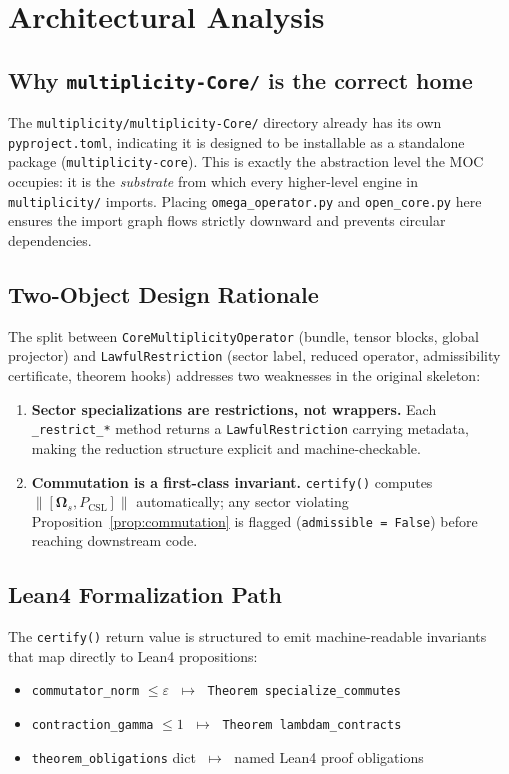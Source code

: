 \documentclass[12pt,a4paper]{article}
\theoremstyle{plain}
\theoremstyle{definition}
\theoremstyle{remark}
\newcommand{\norm}[1]{\left\lVert #1 \right\rVert}
\newcommand{\eps}{\varepsilon}
\begin{document}
\section{Architectural Analysis}
\label{sec:arch}

\subsection{Why \texttt{multiplicity-Core/} is the correct home}

The \texttt{multiplicity/multiplicity-Core/} directory already has its
own \texttt{pyproject.toml}, indicating it is designed to be installable
as a standalone package (\texttt{multiplicity-core}). This is exactly the
abstraction level the MOC occupies: it is the \emph{substrate} from which
every higher-level engine in \texttt{multiplicity/} imports.
Placing \texttt{omega\_operator.py} and \texttt{open\_core.py} here ensures
the import graph flows strictly downward and prevents circular dependencies.

\subsection{Two-Object Design Rationale}

The split between \texttt{CoreMultiplicityOperator} (bundle, tensor blocks,
global projector) and \texttt{LawfulRestriction} (sector label, reduced
operator, admissibility certificate, theorem hooks) addresses two weaknesses
in the original skeleton:
\begin{enumerate}
  \item \textbf{Sector specializations are restrictions, not wrappers.}
        Each \texttt{\_restrict\_*} method returns a
        \texttt{LawfulRestriction} carrying metadata, making the reduction
        structure explicit and machine-checkable.
  \item \textbf{Commutation is a first-class invariant.}
        \texttt{certify()} computes
        $\norm{[\boldsymbol{\Omega}_s, P_{\mathrm{CSL}}]}$ automatically;
        any sector violating Proposition~\ref{prop:commutation} is flagged
        (\texttt{admissible = False}) before reaching downstream code.
\end{enumerate}

\subsection{Lean4 Formalization Path}

The \texttt{certify()} return value is structured to emit machine-readable
invariants that map directly to Lean4 propositions:
\begin{itemize}
  \item \texttt{commutator\_norm} $\le \eps$
        $\;\mapsto\;$ \texttt{Theorem specialize\_commutes}
  \item \texttt{contraction\_gamma} $\le 1$
        $\;\mapsto\;$ \texttt{Theorem lambdam\_contracts}
  \item \texttt{theorem\_obligations} dict
        $\;\mapsto\;$ named Lean4 proof obligations
\end{itemize}
\end{document}
